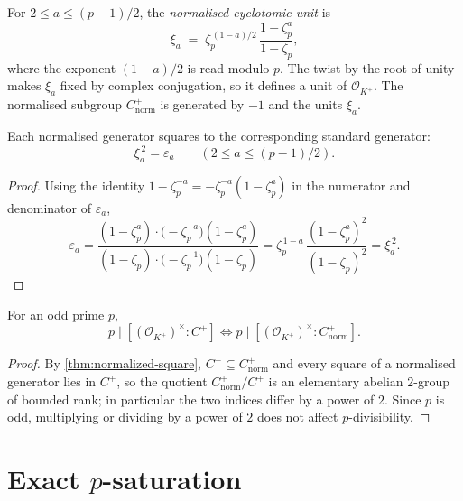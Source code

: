 \begin{definition}\label{def:normalizedCPlus}
  \leanok
For $2 \le a \le (p-1)/2$, the \emph{normalised cyclotomic unit} is
\[
  \xi_a \;=\; \zeta_p^{\,(1-a)/2}\,\frac{1-\zeta_p^a}{1-\zeta_p},
\]
where the exponent $(1-a)/2$ is read modulo $p$.  The twist by the root of
unity makes $\xi_a$ fixed by complex conjugation, so it defines a unit of
$\mathcal O_{K^+}$.  The normalised subgroup $C^+_{\mathrm{norm}}$ is
generated by $-1$ and the units $\xi_a$.
\end{definition}

\begin{theorem}\label{thm:normalized-square}
  \leanok
Each normalised generator squares to the corresponding standard generator:
\[
  \xi_a^{\,2} = \varepsilon_a
  \qquad (2 \le a \le (p-1)/2).
\]
\end{theorem}
\begin{proof}\leanok
Using the identity $1-\zeta_p^{-a} = -\zeta_p^{-a}(1-\zeta_p^a)$ in the
numerator and denominator of $\varepsilon_a$,
\[
  \varepsilon_a
  = \frac{(1-\zeta_p^a)\cdot\bigl(-\zeta_p^{-a}\bigr)(1-\zeta_p^a)}
         {(1-\zeta_p)\cdot\bigl(-\zeta_p^{-1}\bigr)(1-\zeta_p)}
  = \zeta_p^{\,1-a}\,\frac{(1-\zeta_p^a)^2}{(1-\zeta_p)^2}
  = \xi_a^{\,2}.
\]
\end{proof}

\begin{theorem}\label{thm:CPlus-normalized-index}
  \leanok
For an odd prime $p$,
\[
  p\mid[(\mathcal O_{K^+})^\times:C^+]
  \Longleftrightarrow
  p\mid[(\mathcal O_{K^+})^\times:C^+_{\mathrm{norm}}].
\]
\end{theorem}
\begin{proof}\leanok
By \cref{thm:normalized-square}, $C^+ \subseteq C^+_{\mathrm{norm}}$ and
every square of a normalised generator lies in $C^+$, so the quotient
$C^+_{\mathrm{norm}}/C^+$ is an elementary abelian $2$-group of bounded
rank; in particular the two indices differ by a power of $2$.  Since $p$
is odd, multiplying or dividing by a power of $2$ does not affect
$p$-divisibility.
\end{proof}

\section{\texorpdfstring{Exact $p$-saturation}{Exact p-saturation}}


